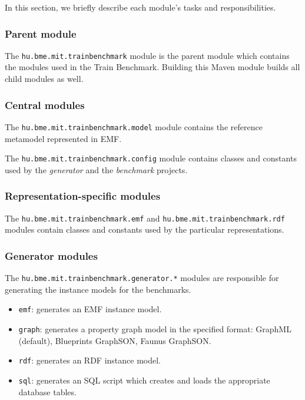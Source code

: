 In this section, we briefly describe each module's tasks and responsibilities.

\subsubsection{Parent module}

The \texttt{hu.bme.mit.trainbenchmark} module is the parent module which contains the modules used in the Train Benchmark. Building this Maven module builds all child modules as well.

\subsubsection{Central modules}

The \texttt{hu.bme.mit.trainbenchmark.model} module contains the reference metamodel represented in EMF.

The \texttt{hu.bme.mit.trainbenchmark.config} module contains classes and constants used by the \emph{generator} and the \emph{benchmark} projects.



\subsubsection{Representation-specific modules}

The \texttt{hu.bme.mit.trainbenchmark.emf} and \texttt{hu.bme.mit.trainbenchmark.rdf} modules contain classes and constants used by the particular representations.



\subsubsection{Generator modules}

The \texttt{hu.bme.mit.trainbenchmark.generator.*} modules are responsible for generating the instance models for the benchmarks.

\begin{itemize}
  \item \texttt{emf}: generates an EMF instance model.
  \item \texttt{graph}: generates a property graph model in the specified format: GraphML (default), Blueprints GraphSON, Faunus GraphSON.
  \item \texttt{rdf}: generates an RDF instance model.
  \item \texttt{sql}: generates an SQL script which creates and loads the appropriate database tables.
\end{itemize}



